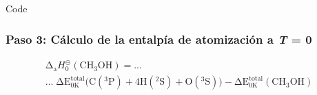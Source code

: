 \documentclass{beamer}
\begin{document}
\begin{frame}[fragile]{Code}
\frametitle{Paso 3: Cálculo de la entalpía de atomización a \textit{T} = 0}


\begin{multline}
	\mathrm{\Delta}_\mathrm{{a}} H^{\circleddash}_{\mathrm{0}}\mathrm{(CH_3OH)}  = ... \\ ...\; \mathrm{\Delta} \mathrm{E^{total}_{0K}} \mathrm{(C(^{3}P)} + \mathrm{4H(^{2}S)} + \mathrm{O(^{3}S))}- \mathrm{\Delta E^{total}_{0K} (CH_{3}OH)}
\label{eq:4.1}
\end{multline}

\end{frame}



\end{document}
